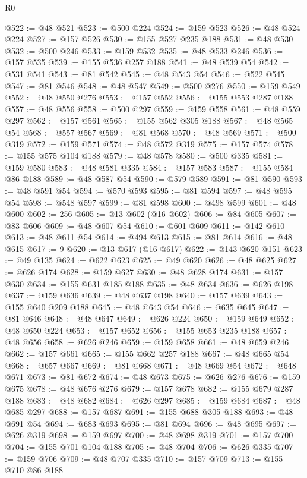 \begin{lexlean}{R0}
\begin{coremodule}
{{{{{@522 := @48 @521
@523 := @500 @224
@524 := @159 @523
@526 := @48 @524 @224
@527 := @157 @526
@530 := @155 @527 @235 @188
@531 := @48 @530
@532 := @500 @246
@533 := @159 @532
@535 := @48 @533 @246
@536 := @157 @535
@539 := @155 @536 @257 @188
@541 := @48 @539 @54
@542 := @531 @541
@543 := @81 @542
@545 := @48 @543 @54
@546 := @522 @545
@547 := @81 @546
@548 := @48 @547
@549 := @500 @276
@550 := @159 @549
@552 := @48 @550 @276
@553 := @157 @552
@556 := @155 @553 @287 @188
@557 := @48 @556
@558 := @500 @297
@559 := @159 @558
@561 := @48 @559 @297
@562 := @157 @561
@565 := @155 @562 @305 @188
@567 := @48 @565 @54
@568 := @557 @567
@569 := @81 @568
@570 := @48 @569
@571 := @500 @319
@572 := @159 @571
@574 := @48 @572 @319
@575 := @157 @574
@578 := @155 @575 @104 @188
@579 := @48 @578
@580 := @500 @335
@581 := @159 @580
@583 := @48 @581 @335
@584 := @157 @583
@587 := @155 @584 @86 @188
@589 := @48 @587 @54
@590 := @579 @589
@591 := @81 @590
@593 := @48 @591 @54
@594 := @570 @593
@595 := @81 @594
@597 := @48 @595 @54
@598 := @548 @597
@599 := @81 @598
@600 := @498 @599
@601 := @48 @600
@602 := 256
@605 := @13 @602 (@16 @602)
@606 := @84 @605
@607 := @83 @606
@609 := @48 @607 @54
@610 := @601 @609
@611 := @142 @610
@613 := @48 @611 @54
@614 := @494 @613
@615 := @81 @614
@616 := @48 @615
@617 := 9
@620 := @13 @617 (@16 @617)
@622 := @143 @620 @151
@623 := @49 @135
@624 := @622 @623
@625 := @49 @620
@626 := @48 @625
@627 := @626 @174
@628 := @159 @627
@630 := @48 @628 @174
@631 := @157 @630
@634 := @155 @631 @185 @188
@635 := @48 @634
@636 := @626 @198
@637 := @159 @636
@639 := @48 @637 @198
@640 := @157 @639
@643 := @155 @640 @209 @188
@645 := @48 @643 @54
@646 := @635 @645
@647 := @81 @646
@648 := @48 @647
@649 := @626 @224
@650 := @159 @649
@652 := @48 @650 @224
@653 := @157 @652
@656 := @155 @653 @235 @188
@657 := @48 @656
@658 := @626 @246
@659 := @159 @658
@661 := @48 @659 @246
@662 := @157 @661
@665 := @155 @662 @257 @188
@667 := @48 @665 @54
@668 := @657 @667
@669 := @81 @668
@671 := @48 @669 @54
@672 := @648 @671
@673 := @81 @672
@674 := @48 @673
@675 := @626 @276
@676 := @159 @675
@678 := @48 @676 @276
@679 := @157 @678
@682 := @155 @679 @287 @188
@683 := @48 @682
@684 := @626 @297
@685 := @159 @684
@687 := @48 @685 @297
@688 := @157 @687
@691 := @155 @688 @305 @188
@693 := @48 @691 @54
@694 := @683 @693
@695 := @81 @694
@696 := @48 @695
@697 := @626 @319
@698 := @159 @697
@700 := @48 @698 @319
@701 := @157 @700
@704 := @155 @701 @104 @188
@705 := @48 @704
@706 := @626 @335
@707 := @159 @706
@709 := @48 @707 @335
@710 := @157 @709
@713 := @155 @710 @86 @188
}}}}}
\end{coremodule}
\end{lexlean}

